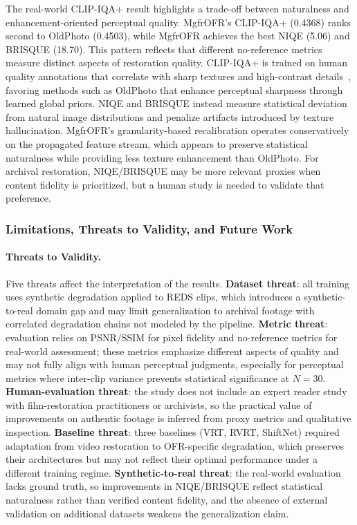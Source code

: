 \documentclass[symmetry,article,submit,pdftex,moreauthors]{Definitions/mdpi}
\begin{document}
The real-world CLIP-IQA+ result highlights a trade-off between naturalness and enhancement-oriented perceptual quality. MgfrOFR's CLIP-IQA+ (0.4368) ranks second to OldPhoto (0.4503), while MgfrOFR achieves the best NIQE (5.06) and BRISQUE (18.70). This pattern reflects that different no-reference metrics measure distinct aspects of restoration quality. CLIP-IQA+ is trained on human quality annotations that correlate with sharp textures and high-contrast details~\cite{wang2023clipiqa}, favoring methods such as OldPhoto that enhance perceptual sharpness through learned global priors. NIQE and BRISQUE instead measure statistical deviation from natural image distributions and penalize artifacts introduced by texture hallucination. MgfrOFR's granularity-based recalibration operates conservatively on the propagated feature stream, which appears to preserve statistical naturalness while providing less texture enhancement than OldPhoto. For archival restoration, NIQE/BRISQUE may be more relevant proxies when content fidelity is prioritized, but a human study is needed to validate that preference.

\subsubsection{Limitations, Threats to Validity, and Future Work}
\label{subsec:limitations}

\paragraph{Threats to Validity.}
Five threats affect the interpretation of the results. \textbf{Dataset threat}: all training uses synthetic degradation applied to REDS clips, which introduces a synthetic-to-real domain gap and may limit generalization to archival footage with correlated degradation chains not modeled by the pipeline. \textbf{Metric threat}: evaluation relies on PSNR/SSIM for pixel fidelity and no-reference metrics for real-world assessment; these metrics emphasize different aspects of quality and may not fully align with human perceptual judgments, especially for perceptual metrics where inter-clip variance prevents statistical significance at $N{=}30$. \textbf{Human-evaluation threat}: the study does not include an expert reader study with film-restoration practitioners or archivists, so the practical value of improvements on authentic footage is inferred from proxy metrics and qualitative inspection. \textbf{Baseline threat}: three baselines (VRT, RVRT, ShiftNet) required adaptation from video restoration to OFR-specific degradation, which preserves their architectures but may not reflect their optimal performance under a different training regime. \textbf{Synthetic-to-real threat}: the real-world evaluation lacks ground truth, so improvements in NIQE/BRISQUE reflect statistical naturalness rather than verified content fidelity, and the absence of external validation on additional datasets weakens the generalization claim.
\end{document}
